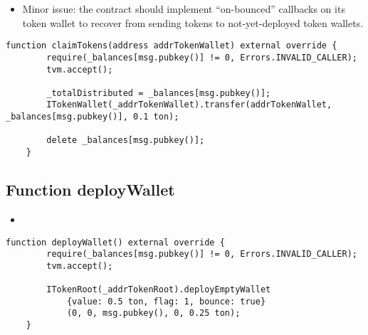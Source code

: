 \begin{itemize}
\item Minor issue: the contract should implement ``on-bounced''
  callbacks on its token wallet to recover from sending tokens to
  not-yet-deployed token wallets.
\end{itemize}

\begin{lstlisting}[firstnumber=28]
    function claimTokens(address addrTokenWallet) external override {
        require(_balances[msg.pubkey()] != 0, Errors.INVALID_CALLER);
        tvm.accept();

        _totalDistributed = _balances[msg.pubkey()];
        ITokenWallet(_addrTokenWallet).transfer(addrTokenWallet, _balances[msg.pubkey()], 0.1 ton);

        delete _balances[msg.pubkey()];
    }
\end{lstlisting}

\subsection{Function deployWallet}

\begin{itemize}
\item {}
\end{itemize}

\begin{lstlisting}[firstnumber=49]
    function deployWallet() external override {
        require(_balances[msg.pubkey()] != 0, Errors.INVALID_CALLER);
        tvm.accept();

        ITokenRoot(_addrTokenRoot).deployEmptyWallet
            {value: 0.5 ton, flag: 1, bounce: true}
            (0, 0, msg.pubkey(), 0, 0.25 ton);
    }
\end{lstlisting}

